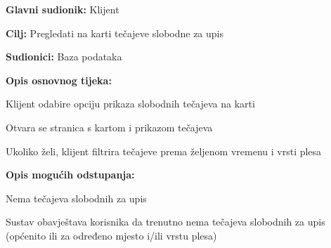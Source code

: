 					\noindent {}
					\begin{packed_item}
	
						\item \textbf{Glavni sudionik: }Klijent
						\item  \textbf{Cilj:} Pregledati na karti tečajeve slobodne za upis
						\item  \textbf{Sudionici:} Baza podataka
						\item  \textbf{Opis osnovnog tijeka:						
						}
						
						\item[] \begin{packed_enum}
	
							\item Klijent odabire opciju prikaza slobodnih tečajeva na karti
							\item Otvara se stranica s kartom i prikazom tečajeva
							\item Ukoliko želi, klijent filtrira tečajeve prema željenom vremenu i vrsti plesa
						\end{packed_enum}
						
						\item  \textbf{Opis mogućih odstupanja:}
						
						\item[] \begin{packed_item}
	
							\item[2.a] Nema tečajeva slobodnih za upis 
							\item[] \begin{packed_enum}
								
								\item Sustav obavještava korisnika da trenutno nema tečajeva slobodnih za upis (općenito ili za određeno mjesto i/ili vrstu plesa)
																
							\end{packed_enum}
														
						\end{packed_item}
					\end{packed_item}
				
